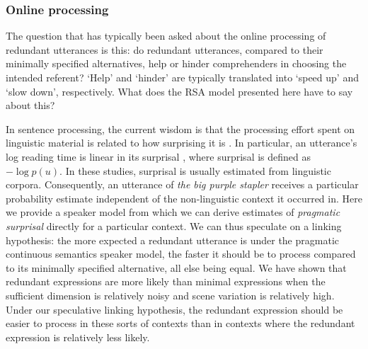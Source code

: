 \documentclass[11pt]{article}
\begin{document}
\subsubsection{Online processing}

The question that has typically been asked about the online processing of redundant utterances is this: do redundant utterances, compared to their minimally specified alternatives, help or hinder comprehenders in choosing the intended referent? `Help' and `hinder' are typically translated into `speed up' and `slow down', respectively. What does the RSA model presented here have to say about this? 

In sentence processing, the current wisdom is that the processing effort spent on linguistic material is related to how surprising it is \cite{Hale2001,Levy2008}. In particular, an utterance's log reading time is linear in its surprisal \cite{Smith2013}, where surprisal is defined as $-\log p(u)$. In these studies, surprisal is usually estimated from linguistic corpora. Consequently, an utterance of \emph{the big purple stapler} receives a particular probability estimate independent of the non-linguistic context it occurred in. Here we provide a speaker model from which we can derive estimates of \emph{pragmatic surprisal} directly for a particular context. We can thus speculate on a linking hypothesis: the more expected a redundant utterance is under the pragmatic continuous semantics speaker model, the faster it should be to process compared to its minimally specified alternative, all else being equal. We have shown that redundant expressions are more likely than minimal expressions when the sufficient dimension is relatively noisy and scene variation is relatively high. Under our speculative linking hypothesis, the redundant expression should be easier to process in these sorts of contexts  than in contexts where the redundant expression is relatively less likely. 
\end{document}
